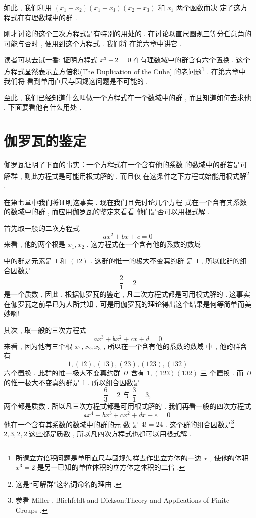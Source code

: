 如此 , 我们利用 $\left(x_{1}-x_{2}\right)\left(x_{1}-x_{3}\right)\left(x_{2}-x_{3}\right)$ 和 $x_{1}$ 两个函数而决 定了这方程式在有理数域中的群 . 

刚才讨论的这个三次方程式是有特别的用处的 . 在讨论以直尺圆规三等分任意角的可能与否时 , 便用到这个方程式 . 我们将 在第六章中讲它 . 

读者可以去试一番: 证明方程式
$x^{3}-2=0$
在有理数域中的群含有六个置换 . 这个方程式显然表示立方倍积(The Duplication of the Cube) 的老问题\footnote{所谓立方倍积问题是单用直尺与圆规怎样去作出立方体的一边 $x$ ,  使他的体积 $x^{3}=2$ 是另一已知的单位体积的立方体之体积的二倍 . } . 在第六章中我们将 看到单用直尺与圆规这问题是不可能的 . 

至此 , 我们已经知道什么叫做一个方程式在一个数域中的群 ,  而且知道如何去求他 . 下面要看他有什么用处 . 

\section{伽罗瓦的鉴定}
伽罗瓦证明了下面的事实：一个方程式在一个含有他的系数 的数域中的群若是可解群 , 则此方程式是可能用根式解的 , 而且仅 在这条件之下方程式始能用根式解\footnote{这是“可解群”这名词命名的理由 . } . 

在第七章中我们将证明这事实 . 现在我们且先讨论几个方程 式在一个含有其系数的数域中的群 , 而应用伽罗瓦的鉴定来看看 他们是否可以用根式解 . 

首先取一般的二次方程式
\[
a x^{2}+b x+c=0
\]
来看 , 他的两个根是 $x_{1} ,  x_{2}$ .  这方程式在一个含有他的系数的数域

中的群之元素是 $1$ 和 $(12)$ . 这群的惟一的极大不变真约群 是 $1$ , 
所以此群的组合因数是
\[
\dfrac{2}{1}=2
\]
是一个质数 ,  因此 ,  根据伽罗瓦的鉴定 ,  凡二次方程式都是可用根式解的 . 这事实在伽罗瓦之前早已为人所共知 , 可是用伽罗瓦的理论得出这个结果是何等简单而美妙啊!

其次 ,  取一般的三次方程式
\[
a x^{3}+b x^{2}+c x+d=0
\]
来看 , 因为他有三个根 $x_{1} ,  x_{2} ,  x_{3}$ ,  所以在一个含有他的系数的数域
中 , 他的群含有
\[
1 , (12) , (13) , (23) , (123) , (132)
\]
六个置换 . 此群的惟一极大不变真约群 $H$ 含有 $1 , (123)(132)$ 三
个置换 . 而 $H$ 的惟一极大不变真约群是 1  . 所以组合因数是
\[
\dfrac{6}{3}=2 \text { 与 } \dfrac{3}{1}=3 , 
\]
两个都是质数 . 所以凡三次方程式都是可用根式解的 .  我们再看一般的四次方程式
\[a x^{4}+b x^{3}+c x^{2}+d x+e=0  . \]
他在一个含有其系数的数域中的群的元 数 是 $4!=24$  . 这个群的组合因数是\footnote{参看 Miller ,  Blichfeldt and Dickson:Theory and Applications of Finite Groups . }
$2 , 3 , 2 , 2$
这些都是质数 , 所以凡四次方程式也都可以用根式解 . 

